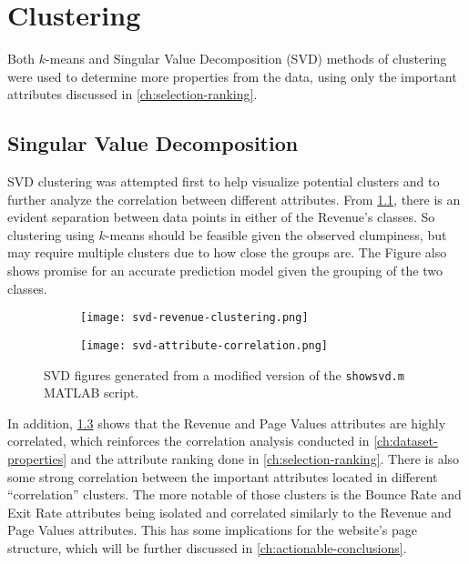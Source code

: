 \documentclass[../cmpe-251-project-report.tex]{subfiles}
\begin{document}
  \chapter{Clustering}
  \label{ch:clustering}
  Both \(k\)-means and Singular Value Decomposition (SVD) methods of clustering were used to determine more properties from the data, using only the important attributes discussed in \cref{ch:selection-ranking}.

  \section{Singular Value Decomposition}
  SVD clustering was attempted first to help visualize potential clusters and to further analyze the correlation between different attributes. From \cref{subfig:svd-revenue-clustering}, there is an evident separation between data points in either of the Revenue's classes. So clustering using \(k\)-means should be feasible given the observed clumpiness, but may require multiple clusters due to how close the groups are. The Figure also shows promise for an accurate prediction model given the grouping of the two classes.
  \begin{figure}
    \begin{subfigure}[t]{0.49\textwidth}
      \texttt{[image: svd-revenue-clustering.png]}
      \label{subfig:svd-revenue-clustering}
    \end{subfigure}
    \begin{subfigure}[t]{0.49\textwidth}
      \texttt{[image: svd-attribute-correlation.png]}
      \label{subfig:svd-attribute-correlation}
    \end{subfigure}
    \caption{SVD figures generated from a modified version of the \texttt{showsvd.m} MATLAB script.}
  \end{figure}
  In addition, \cref{subfig:svd-attribute-correlation} shows that the Revenue and Page Values attributes are highly correlated, which reinforces the correlation analysis conducted in \cref{ch:dataset-properties} and the attribute ranking done in \cref{ch:selection-ranking}. There is also some strong correlation between the important attributes located in different ``correlation'' clusters. The more notable of those clusters is the Bounce Rate and Exit Rate attributes being isolated and correlated similarly to the Revenue and Page Values attributes. This has some implications for the website's page structure, which will be further discussed in \cref{ch:actionable-conclusions}.
\end{document}
